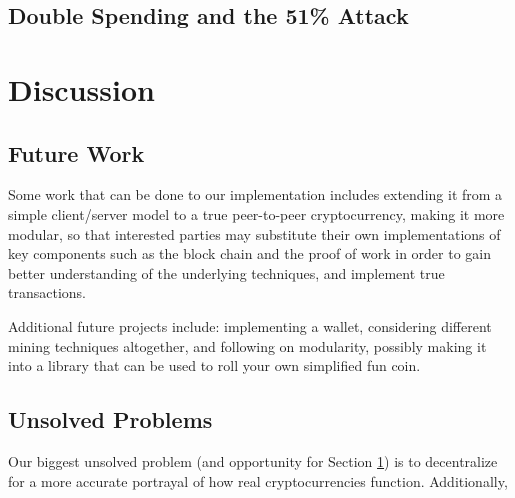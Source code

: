 \documentclass[12pt]{article}
\begin{document}
\subsection{Double Spending and the 51\% Attack}\label{doublespend}

\section{Discussion}\label{future}
\subsection{Future Work}\label{work}
Some work that can be done to our implementation includes extending it from a simple client/server model to a true peer-to-peer cryptocurrency, making it more modular, so that interested parties may substitute their own implementations of key components such as the block chain and the proof of work in order to gain better understanding of the underlying techniques, and implement true transactions. 

Additional future projects include: implementing a wallet, considering different mining techniques altogether, and following on modularity, possibly making it into a library that can be used to roll your own simplified fun coin.

\subsection{Unsolved Problems}\label{unsolved}
Our biggest unsolved problem (and opportunity for Section \ref{future}) is to decentralize for a more accurate portrayal of how real cryptocurrencies function. Additionally, 



\end{document}
